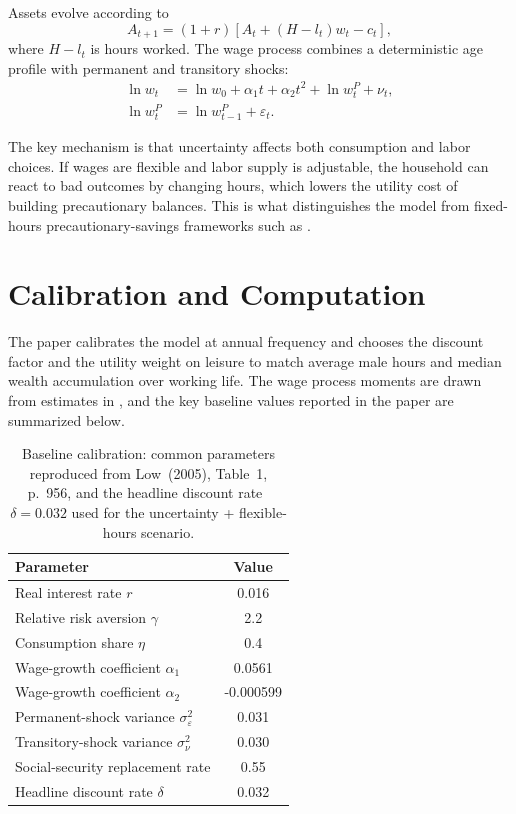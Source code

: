 \documentclass[titlepage, headings=optiontotocandhead]{econark} %
\begin{document}
Assets evolve according to
\begin{equation}
  A_{t+1}=(1+r)\left[A_t + (H-l_t)w_t - c_t\right],
\end{equation}
where $H-l_t$ is hours worked. The wage process combines a deterministic age profile with
permanent and transitory shocks:
\begin{align}
  \ln w_t &= \ln w_0 + \alpha_1 t + \alpha_2 t^2 + \ln w_t^P + \nu_t, \\
  \ln w_t^P &= \ln w_{t-1}^P + \varepsilon_t.
\end{align}

The key mechanism is that uncertainty affects both consumption and labor choices. If wages
are flexible and labor supply is adjustable, the household can react to bad outcomes by
changing hours, which lowers the utility cost of building precautionary balances. This is what
distinguishes the model from fixed-hours precautionary-savings frameworks such as
\citet{Deaton1991Low, GourinchasParker2002Low, Cagetti2003Low}.

\section{Calibration and Computation}
The paper calibrates the model at annual frequency and chooses the discount factor and the
utility weight on leisure to match average male hours and median wealth accumulation over
working life. The wage process moments are drawn from estimates in \citet{MeghirPistaferri2004Low},
and the key baseline values reported in the paper are summarized below.

\begin{table}[htbp]
  \centering
  \caption{Baseline calibration: common parameters reproduced from
  Low~(2005), Table~1, p.~956, and the headline discount
  rate~$\delta = 0.032$ used for the
  uncertainty + flexible-hours scenario.}
  \label{tab:calibration}
  \begin{tabular}{lc}
    \toprule
    Parameter & Value \\
    \midrule
    Real interest rate $r$ & 0.016 \\
    Relative risk aversion $\gamma$ & 2.2 \\
    Consumption share $\eta$ & 0.4 \\
    Wage-growth coefficient $\alpha_1$ & 0.0561 \\
    Wage-growth coefficient $\alpha_2$ & -0.000599 \\
    Permanent-shock variance $\sigma^2_{\varepsilon}$ & 0.031 \\
    Transitory-shock variance $\sigma^2_{\nu}$ & 0.030 \\
    Social-security replacement rate & 0.55 \\
    Headline discount rate $\delta$ & 0.032 \\
    \bottomrule
  \end{tabular}
\end{table}
\end{document}
